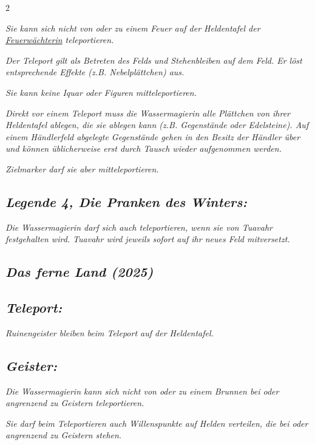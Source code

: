 \documentclass[10pt, a4paper, oneside]{book}
\newcommand{\fan}[1]{\textit{#1}}
\begin{document}
\begin{multicols*}{2}
\begin{bgcolor}
\fan{Sie kann sich nicht von oder zu einem Feuer auf der Heldentafel der \hyperref[feuerwaechterin]{Feuerwächterin} teleportieren.}


\fan{Der Teleport gilt als Betreten des Felds und Stehenbleiben auf dem Feld. Er löst entsprechende Effekte (z.B. Nebelplättchen) aus.}

\fan{Sie kann keine Iquar oder Figuren mitteleportieren.}

\fan{Direkt vor einem Teleport muss die Wassermagierin alle Plättchen von ihrer Heldentafel ablegen, die sie ablegen kann (z.B. Gegenstände oder Edelsteine). Auf einem Händlerfeld abgelegte Gegenstände gehen in den Besitz der Händler über und können üblicherweise erst durch Tausch wieder aufgenommen werden.}

\fan{Zielmarker darf sie aber mitteleportieren.}





\subsection{\fan{Legende 4, Die Pranken des Winters:}}

\fan{Die Wassermagierin darf sich auch teleportieren, wenn sie von Tuavahr festgehalten wird. Tuavahr wird jeweils sofort auf ihr neues Feld mitversetzt.}




\end{bgcolor}



\columnbreak


\begin{bgcolor}
\section{\fan{Das ferne Land (2025)}}


\subsection{\fan{Teleport:}}

\fan{Ruinengeister bleiben beim Teleport auf der Heldentafel.}


\subsection{\fan{Geister:}}

\fan{Die Wassermagierin kann sich nicht von oder zu einem Brunnen bei oder angrenzend zu Geistern teleportieren.}

\fan{Sie darf beim Teleportieren auch Willenspunkte auf Helden verteilen, die bei oder angrenzend zu Geistern stehen.}

\end{bgcolor}





\end{multicols*}
\end{document}
